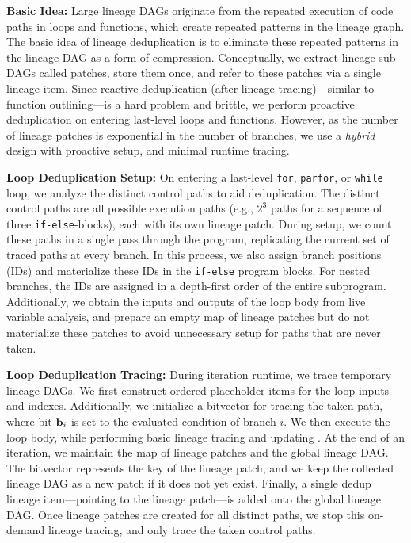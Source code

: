 \textbf{Basic Idea:} Large lineage DAGs originate from the repeated execution of code paths in loops and functions, which create repeated patterns in the lineage graph. The basic idea of lineage deduplication is to eliminate these repeated patterns in the lineage DAG as a form of compression. Conceptually, we extract lineage sub-DAGs called patches, store them once, and refer to these patches via a single lineage item. Since reactive deduplication (after lineage tracing)---similar to function outlining---is a hard problem and brittle, we perform proactive deduplication on entering last-level loops and functions. However, as the number of lineage patches is exponential in the number of branches, we use a \emph{hybrid} design with proactive setup, and minimal runtime tracing.

\textbf{Loop Deduplication Setup:} On entering a last-level \texttt{for}, \texttt{parfor}, or \texttt{while} loop, we analyze the distinct control paths to aid deduplication. The distinct control paths are all possible execution paths (e.g., $2^3$ paths for a sequence of three \texttt{if-else}-blocks), each with its own lineage patch. During setup, we count these paths in a single pass through the program, replicating the current set of traced paths at every branch. In this process, we also assign branch positions (IDs) and materialize these IDs in the \texttt{if-else} program blocks. For nested branches, the IDs are assigned in a depth-first order of the entire subprogram. Additionally, we obtain the inputs and outputs of the loop body from live variable analysis, and prepare an empty map of lineage patches but do not materialize these patches to avoid unnecessary setup for paths that are never taken.

\textbf{Loop Deduplication Tracing:} During iteration runtime, we trace temporary lineage DAGs. We first construct ordered placeholder items for the loop inputs and indexes. Additionally, we initialize a bitvector  for tracing the taken path, where bit $\mathbf{b}_i$ is set to the evaluated condition of branch $i$. We then execute the loop body, while performing basic lineage tracing and updating . At the end of an iteration, we maintain the map of lineage patches and the global lineage DAG. The bitvector  represents the key of the lineage patch, and we keep the collected lineage DAG as a new patch if it does not yet exist. Finally, a single dedup lineage item---pointing to the lineage patch---is added onto the global lineage DAG. Once lineage patches are created for all distinct paths, we stop this on-demand lineage tracing, and only trace the taken control paths.


